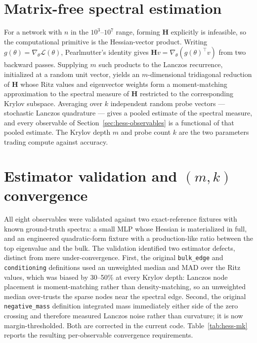 \documentclass[11pt,a4paper]{article}
\newcommand{\bH}{\mathbf{H}}
\begin{document}
\section{Matrix-free spectral estimation}
\label{sec:hess-lanczos}

For a network with $n$ in the $10^3$--$10^7$ range, forming $\bH$ explicitly is
infeasible, so the computational primitive is the Hessian-vector product.
Writing $g(\theta) = \nabla_\theta \mathcal{L}(\theta)$, Pearlmutter's
identity gives $\bH v = \nabla_\theta(g(\theta)^\top v)$ from two backward
passes. Supplying $m$ such products to the Lanczos recurrence, initialized at a
random unit vector, yields an $m$-dimensional tridiagonal reduction of $\bH$
whose Ritz values and eigenvector weights form a moment-matching approximation
to the spectral measure of $\bH$ restricted to the corresponding Krylov
subspace. Averaging over $k$ independent random probe vectors --- stochastic
Lanczos quadrature --- gives a pooled estimate of the spectral measure, and
every observable of Section~\ref{sec:hess-observables} is a functional of that
pooled estimate. The Krylov depth $m$ and probe count $k$ are the two parameters
trading compute against accuracy.

\section{Estimator validation and $(m,k)$ convergence}
\label{sec:hess-validation}

All eight observables were validated against two exact-reference fixtures with
known ground-truth spectra: a small MLP whose Hessian is materialized in full,
and an engineered quadratic-form fixture with a production-like ratio between
the top eigenvalue and the bulk. The validation identified two estimator
defects, distinct from mere under-convergence. First, the original
\texttt{bulk\_edge} and \texttt{conditioning} definitions used an unweighted
median and MAD over the Ritz values, which was biased by 30--50\% at every
Krylov depth: Lanczos node placement is moment-matching rather than
density-matching, so an unweighted median over-trusts the sparse nodes near the
spectral edge. Second, the original \texttt{negative\_mass} definition
integrated mass immediately either side of the zero crossing and therefore
measured Lanczos noise rather than curvature; it is now margin-thresholded. Both
are corrected in the current code. Table~\ref{tab:hess-mk} reports the resulting
per-observable convergence requirements.
\end{document}
